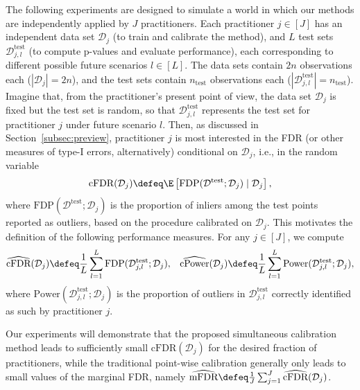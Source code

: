 The following experiments are designed to simulate a world in which our methods are {independently applied by $J$ practitioners}. Each practitioner $j \in [J]$ has an independent data set $\mathcal{D}_j$ (to train and calibrate the method), and $L$ test sets $\mathcal{D}^{\mathrm{test}}_{j,l}$ (to compute p-values and evaluate performance), each corresponding to different possible future scenarios $l \in [L]$.
The data sets contain $2n$ observations each ($|\mathcal{D}_j|=2n$), and the test sets contain $n_{\text{test}}$ observations each ($|\mathcal{D}^{\mathrm{test}}_{j,l}|=n_{\text{test}}$).
Imagine that, from the practitioner's present point of view, the data set $\mathcal{D}_j$ is fixed but the test set is random, so that $\mathcal{D}^{\mathrm{test}}_{j,l}$ represents the test set for practitioner $j$ under future scenario $l$.
Then, as discussed in Section~\ref{subsec:preview}, practitioner $j$ {is most interested in the FDR} (or other measures of type-I errors, alternatively) conditional on $\mathcal{D}_j${, i.e., in the random variable}
\begin{align*}
\text{cFDR}(\mathcal{D}_j) \defeq \E\left[ \text{FDP}(\mathcal{D}^{\mathrm{test}}; \mathcal{D}_j) \mid \mathcal{D}_j \right],
\end{align*}
where $\text{FDP}(\mathcal{D}^{\mathrm{test}}; \mathcal{D}_j)$ is the proportion of inliers among the test points reported as outliers, based on the procedure calibrated on $\mathcal{D}_j$.
This motivates the definition of the following performance measures. For any $j \in [J]$, we compute
\begin{align} \label{eq:fdr-pow-sim}
    & \widehat{\text{cFDR}}(\mathcal{D}_j) \defeq \frac{1}{L} \sum_{l=1}^{L} \text{FDP}(\mathcal{D}^{\mathrm{test}}_{j,l}; \mathcal{D}_j),
    & \widehat{\text{cPower}}(\mathcal{D}_j)
    \defeq \frac{1}{L} \sum_{l=1}^{L} \text{Power}(\mathcal{D}^{\mathrm{test}}_{j,l}; \mathcal{D}_j),
\end{align}
where $\text{Power}(\mathcal{D}^{\mathrm{test}}_{j,l}; \mathcal{D}_j)$ is the proportion of outliers in $\mathcal{D}^{\mathrm{test}}_{j,l}$ correctly identified as such by practitioner $j$.

Our experiments will demonstrate that the proposed simultaneous calibration method leads to sufficiently small $\widehat{\text{cFDR}}(\mathcal{D}_j)$ for the desired fraction of practitioners, while the traditional point-wise calibration generally only leads to small values of the marginal FDR, namely $\widehat{\text{mFDR}} \defeq \frac{1}{J} \sum_{j=1}^{J} \widehat{\text{cFDR}}(\mathcal{D}_j)$.


